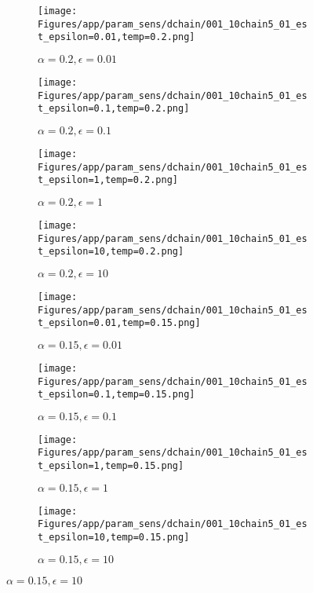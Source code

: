 \documentclass{article}
\theoremstyle{plain}
\begin{document}
\begin{appendices}
\begin{figure}
                \begin{subfigure}[b]{0.24\textwidth}
                    \centering
                    \texttt{[image: Figures/app/param\_sens/dchain/001\_10chain5\_01\_est\_epsilon=0.01,temp=0.2.png]}
                    \caption*{$\alpha=0.2,\epsilon=0.01$}
                \end{subfigure}
                \begin{subfigure}[b]{0.24\textwidth}
                    \centering
                    \texttt{[image: Figures/app/param\_sens/dchain/001\_10chain5\_01\_est\_epsilon=0.1,temp=0.2.png]}
                    \caption*{$\alpha=0.2,\epsilon=0.1$}
                \end{subfigure}
                \begin{subfigure}[b]{0.24\textwidth}
                    \centering
                    \texttt{[image: Figures/app/param\_sens/dchain/001\_10chain5\_01\_est\_epsilon=1,temp=0.2.png]}
                    \caption*{$\alpha=0.2,\epsilon=1$}
                \end{subfigure}
                \begin{subfigure}[b]{0.24\textwidth}
                    \centering
                    \texttt{[image: Figures/app/param\_sens/dchain/001\_10chain5\_01\_est\_epsilon=10,temp=0.2.png]}
                    \caption*{$\alpha=0.2,\epsilon=10$}
                \end{subfigure}
                
                \begin{subfigure}[b]{0.24\textwidth}
                    \centering
                    \texttt{[image: Figures/app/param\_sens/dchain/001\_10chain5\_01\_est\_epsilon=0.01,temp=0.15.png]}
                    \caption*{$\alpha=0.15,\epsilon=0.01$}
                \end{subfigure}
                \begin{subfigure}[b]{0.24\textwidth}
                    \centering
                    \texttt{[image: Figures/app/param\_sens/dchain/001\_10chain5\_01\_est\_epsilon=0.1,temp=0.15.png]}
                    \caption*{$\alpha=0.15,\epsilon=0.1$}
                \end{subfigure}
                \begin{subfigure}[b]{0.24\textwidth}
                    \centering
                    \texttt{[image: Figures/app/param\_sens/dchain/001\_10chain5\_01\_est\_epsilon=1,temp=0.15.png]}
                    \caption*{$\alpha=0.15,\epsilon=1$}
                \end{subfigure}
                \begin{subfigure}[b]{0.24\textwidth}
                    \centering
                    \texttt{[image: Figures/app/param\_sens/dchain/001\_10chain5\_01\_est\_epsilon=10,temp=0.15.png]}
                    \caption*{$\alpha=0.15,\epsilon=10$}
                \end{subfigure}
                

\end{figure}
\end{appendices}
\end{document}
